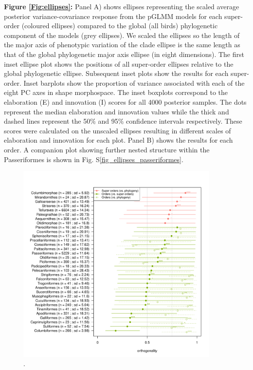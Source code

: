 \documentclass[12pt,letterpaper]{article}
\begin{document}
\noindent \textbf{Figure \ref{Fig:ellipses}:}
Panel A) shows ellipses representing the scaled average posterior variance-covariance response from the pGLMM models for each super-order (coloured ellipses) compared to the global (all birds) phylogenetic component of the models (grey ellipses).
We scaled the ellipses so the length of the major axis of phenotypic variation of the clade ellipse is the same length as that of the global phylogenetic major axis ellipse (in eight dimensions).
The first inset ellipse plot shows the positions of all super-order ellipses relative to the global phylogenetic ellipse.
Subsequent inset plots show the results for each super-order. 
Inset barplots show the proportion of variance associated with each of the eight PC axes in shape morphospace.
The inset boxplots correspond to the elaboration (E) and innovation (I) scores for all 4000 posterior samples.
The dots represent the median elaboration and innovation values while the thick and dashed lines represent the 50\% and 95\% confidence intervals respectively.
These scores were calculated on the unscaled ellipses resulting in different scales of elaboration and innovation for each plot. %
Panel B) shows the results for each order.
A companion plot showing further nested structure within the Passeriformes is shown in Fig. S\ref{fig_ellipses_passeriformes}.

\bigskip

\bigskip





\begin{figure}[!htbp]
\centering
   \includegraphics[width=0.9\textwidth]{Figures/orthogonality_results.pdf}
\caption{.}
\label{Fig:orthogonality}
\end{figure}
\end{document}
